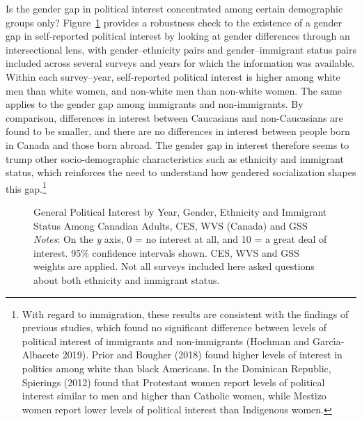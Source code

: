 \documentclass[
  letterpaper,
  DIV=11,
  numbers=noendperiod]{scrreprt}
\begin{document}
Is the gender gap in political interest concentrated among certain
demographic groups only? Figure~\ref{fig-interestwavegroup} provides a
robustness check to the existence of a gender gap in self-reported
political interest by looking at gender differences through an
intersectional lens, with gender--ethnicity pairs and gender--immigrant
status pairs included across several surveys and years for which the
information was available. Within each survey--year, self-reported
political interest is higher among white men than white women, and
non-white men than non-white women. The same applies to the gender gap
among immigrants and non-immigrants. By comparison, differences in
interest between Caucasians and non-Caucasians are found to be smaller,
and there are no differences in interest between people born in Canada
and those born abroad. The gender gap in interest therefore seems to
trump other socio-demographic characteristics such as ethnicity and
immigrant status, which reinforces the need to understand how gendered
socialization shapes this gap.\footnote{With regard to immigration,
  these results are consistent with the findings of previous studies,
  which found no significant difference between levels of political
  interest of immigrants and non-immigrants (Hochman and Garcı́a-Albacete
  2019). Prior and Bougher (2018) found higher levels of interest in
  politics among white than black Americans. In the Dominican Republic,
  Spierings (2012) found that Protestant women report levels of
  political interest similar to men and higher than Catholic women,
  while Mestizo women report lower levels of political interest than
  Indigenous women.}

\begin{figure}


\caption{\label{fig-interestwavegroup}General Political Interest by
Year, Gender, Ethnicity and Immigrant Status Among Canadian Adults, CES,
WVS (Canada) and GSS \newline \textit{Notes}: On the \textit{y} axis, 0
= no interest at all, and 10 = a great deal of interest. 95\% confidence
intervals shown. CES, WVS and GSS weights are applied. Not all surveys
included here asked questions about both ethnicity and immigrant
status.}

\end{figure}%
\end{document}
